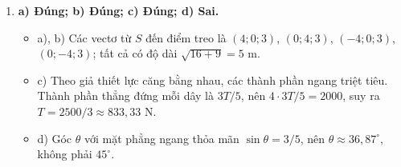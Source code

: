 \documentclass[12pt,a4paper]{article}
\begin{document}
\begin{enumerate}[label=\textbf{Câu \arabic*:}, leftmargin=*]
\begin{itemize}[leftmargin=*]
\end{itemize}
\item \textbf{a) Đúng; b) Đúng; c) Đúng; d) Sai.}
\begin{itemize}[leftmargin=*]
\item a), b) Các vectơ từ $S$ đến điểm treo là $(4;0;3)$, $(0;4;3)$, $(-4;0;3)$, $(0;-4;3)$; tất cả có độ dài $\sqrt{16+9}=5$ m.
\item c) Theo giả thiết lực căng bằng nhau, các thành phần ngang triệt tiêu. Thành phần thẳng đứng mỗi dây là $3T/5$, nên $4\cdot3T/5=2000$, suy ra $T=2500/3\approx833{,}33$ N.
\item d) Góc $\theta$ với mặt phẳng ngang thỏa mãn $\sin\theta=3/5$, nên $\theta\approx36{,}87^\circ$, không phải $45^\circ$.
\end{itemize}
\end{enumerate}
\end{document}
